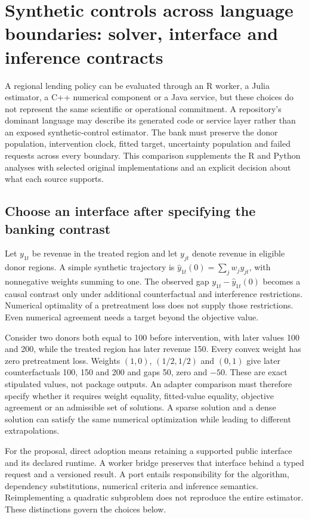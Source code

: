\section{Synthetic controls across language boundaries: solver, interface and inference contracts}
\label{sec:exec25-synthetic-crosslanguage}

A regional lending policy can be evaluated through an R worker, a Julia
estimator, a C++ numerical component or a Java service, but these choices
do not represent the same scientific or operational commitment. A repository's
dominant language may describe its generated code or service layer rather
than an exposed synthetic-control estimator. The bank must preserve the
donor population, intervention clock, fitted target, uncertainty population
and failed requests across every boundary. This comparison supplements the
R and Python analyses with selected original implementations and an explicit
decision about what each source supports.\citep{exec25_synthcross_choice}

\subsection{Choose an interface after specifying the banking contrast}
Let $y_{1t}$ be revenue in the treated region and let $y_{jt}$ denote revenue
in eligible donor regions. A simple synthetic trajectory is
$\widehat y_{1t}(0)=\sum_j w_jy_{jt}$, with nonnegative weights summing to one.
The observed gap $y_{1t}-\widehat y_{1t}(0)$ becomes a causal contrast only
under additional counterfactual and interference restrictions. Numerical
optimality of a pretreatment loss does not supply those restrictions.
Even numerical agreement needs a target beyond the objective value.
\citep{exec25_synthcross_choice}

Consider two donors both equal to 100 before intervention, with later values
100 and 200, while the treated region has later revenue 150. Every convex
weight has zero pretreatment loss. Weights $(1,0)$, $(1/2,1/2)$ and $(0,1)$
give later counterfactuals 100, 150 and 200 and gaps 50, zero and $-50$.
These are exact stipulated values, not package outputs. An adapter comparison
must therefore specify whether it requires weight equality, fitted-value
equality, objective agreement or an admissible set of solutions. A sparse
solution and a dense solution can satisfy the same numerical optimization
while leading to different extrapolations.\citep{exec25_synthcross_choice}

For the proposal, direct adoption means retaining a supported public
interface and its declared runtime. A worker bridge preserves that interface
behind a typed request and a versioned result. A port entails responsibility
for the algorithm, dependency substitutions, numerical criteria and inference
semantics. Reimplementing a quadratic subproblem does not reproduce the
entire estimator. These distinctions govern the choices below.
\citep{exec25_synthcross_choice}


